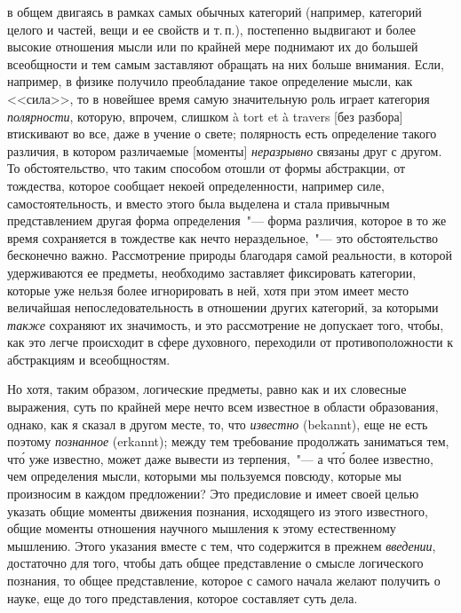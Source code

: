 в общем двигаясь в рамках самых обычных категорий
(например, категорий целого и частей, вещи и ее свойств
и т.\,п.), постепенно выдвигают и более высокие отношения
мысли или по крайней мере поднимают их до большей
всеобщности и тем самым заставляют обращать на
них больше внимания. Если, например, в физике получило
преобладание такое определение мысли, как <<сила>>, то
в новейшее время самую значительную роль играет категория
\emph{полярности}\endnotemark{}, которую, впрочем, слишком à tort et à
travers [без разбора] втискивают во все, даже в учение
о свете; полярность есть определение такого различия, в
котором различаемые [моменты] \emph{неразрывно} связаны
друг с другом. То обстоятельство, что таким способом
отошли от формы абстракции, от тождества, которое
сообщает некоей определенности, например силе, самостоятельность,
и вместо этого была выделена и стала привычным
представлением другая форма определения~"---
форма различия, которое в то же время сохраняется в
тождестве как нечто нераздельное,~"--- это обстоятельство
бесконечно важно. Рассмотрение природы благодаря самой
реальности, в которой удерживаются ее предметы,
необходимо заставляет фиксировать категории, которые
уже нельзя более игнорировать в ней, хотя при этом имеет
место величайшая непоследовательность в отношении
других категорий, за которыми \emph{также} сохраняют их значимость,
и это рассмотрение не допускает того, чтобы,
как это легче происходит в сфере духовного, переходили
от противоположности к абстракциям и всеобщностям.


Но хотя, таким образом, логические предметы, равно
как и их словесные выражения, суть по крайней мере
нечто всем известное в области образования, однако, как
я сказал в другом месте\endnotemark{}, то, что \emph{известно} (bekannt),
еще не есть поэтому \emph{познанное} (erkannt); между тем
требование продолжать заниматься тем, чт\'о уже известно,
может даже вывести из терпения,~"--- а чт\'о более известно,
чем определения мысли, которыми мы пользуемся
повсюду, которые мы произносим в каждом предложении?
Это предисловие и имеет своей целью указать общие
моменты движения познания, исходящего из этого известного,
общие моменты отношения научного мышления
к этому естественному мышлению. Этого указания вместе
с тем, что содержится в прежнем \emph{введении}, достаточно
для того, чтобы дать общее представление о смысле логического
познания, то общее представление, которое с самого
начала желают получить о науке, еще до того представления,
которое составляет суть дела.

